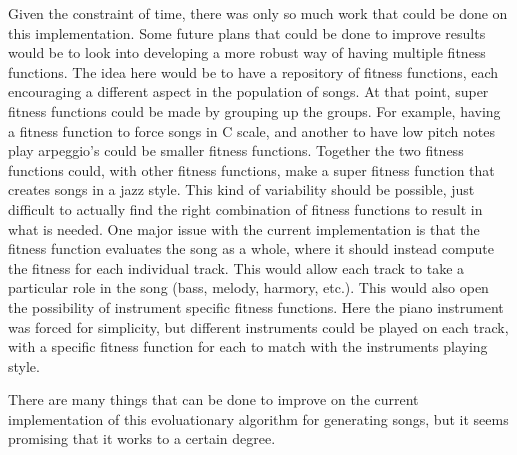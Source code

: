 \documentclass{article}
\begin{document}
Given the constraint of time, there was only so much work that could be done on this implementation. Some future plans that could be done to improve results would be to look into developing a more robust way of having multiple fitness functions. The idea here would be to have a repository of fitness functions, each encouraging a different aspect in the population of songs. At that point, super fitness functions could be made by grouping up the groups. For example, having a fitness function to force songs in C scale, and another to have low pitch notes play arpeggio's could be smaller fitness functions. Together the two fitness functions could, with other fitness functions, make a super fitness function that creates songs in a jazz style. This kind of variability should be possible, just difficult to actually find the right combination of fitness functions to result in what is needed. One major issue with the current implementation is that the fitness function evaluates the song as a whole, where it should instead compute the fitness for each individual track. This would allow each track to take a particular role in the song (bass, melody, harmory, etc.). This would also open the possibility of instrument specific fitness functions. Here the piano instrument was forced for simplicity, but different instruments could be played on each track, with a specific fitness function for each to match with the instruments playing style.

There are many things that can be done to improve on the current implementation of this evoluationary algorithm for generating songs, but it seems promising that it works to a certain degree. 
\end{document}
